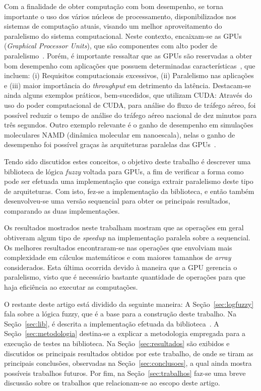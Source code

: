 \documentclass[12pt]{article}
\begin{document}

	Com a finalidade de obter computação com bom desempenho, se torna importante o uso dos vários núcleos de processamento, disponibilizados nos sistemas de computação atuais, visando um melhor aproveitamento do paralelismo do sistema computacional. Neste contexto, encaixam-se as GPUs (\textit{Graphical Processor Units}), que são componentes com alto poder de paralelismo~\cite{sengupta:07}. Porém, é importante ressaltar que as GPUs são reservadas a obter bom desempenho com aplicações que possuem determinadas características~\cite{owens:08}, que incluem: (i) Requisitos computacionais excessivos, (ii) Paralelismo nas aplicações e (iii) maior importância do \textit{throughput} em detrimento da latência. Destacam-se ainda alguns exemplos práticos, bem-sucedidos, que utilizam CUDA:
Através do uso do poder computacional de CUDA, para análise do fluxo de tráfego aéreo, foi possível reduzir o tempo de análise do tráfego aéreo nacional de dez minutos para três segundos. Outro exemplo relevante é o ganho de desempenho em simulações moleculares NAMD (dinâmica molecular em nanoescala), nelas o ganho de desempenho foi possível graças às arquiteturas paralelas das GPUs~\cite{nvidia:15}.

	Tendo sido discutidos estes conceitos, o objetivo deste trabalho é descrever uma biblioteca de lógica \textit{fuzzy} voltada para GPUs, a fim de verificar a forma como pode ser efetuada uma implementação que consiga extrair paralelismo deste tipo de arquiteturas. Com isto, fez-se a implementação da biblioteca, e então também desenvolveu-se uma versão sequencial para obter os principais resultados, comparando as duas implementações.
	
	Os resultados mostrados neste trabalham mostram que as operações em geral obtiveram algum tipo de \textit{speedup} na implementação paralela sobre a sequencial. Os melhores resultados encontraram-se nas operações que envolviam mais complexidade em cálculos matemáticos e com maiores tamanhos de \textit{array} considerados. Esta última ocorrida devido à maneira que a GPU gerencia o paralelismo, visto que é necessário bastante quantidade de operações para que haja eficiência ao executar as computações.
	
	O restante deste artigo está dividido da seguinte maneira: A Seção~\ref{sec:logfuzzy} fala sobre a lógica fuzzy, que é a base para a construção deste trabalho. Na Seção~\ref{sec:lib}, é descrita a implementação efetuada da biblioteca~\libname. A Seção~\ref{sec:metodologia} destina-se a explicar a metodologia empregada para a execução de testes na biblioteca. Na Seção~\ref{sec:resultados} são exibidos e discutidos os principais resultados obtidos por este trabalho, de onde se tiram as principais conclusões, observadas na Seção~\ref{sec:conclusoes}, a qual ainda mostra possíveis trabalhos futuros. Por fim, na Seção~\ref{sec:trabalhos} faz-se uma breve discussão sobre os trabalhos que relacionam-se ao escopo deste artigo.
\end{document}
